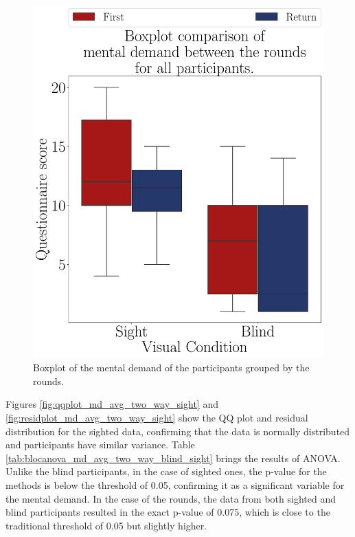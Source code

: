 \begin{figure}[!htb]
\begin{minipage}{0.45\textwidth}
        \includegraphics[width = \textwidth]{Resultados/Nasa/Figuras/pdf/boxplot_noBase_md_4_rounds.pdf}
        \caption{Boxplot of the mental demand of the participants grouped by the rounds.}
        \label{fig:boxplot_noBase_md_4_rounds}
    \end{minipage}
\end{figure}

Figures \ref{fig:qqplot_md_avg_two_way_sight} and \ref{fig:residplot_md_avg_two_way_sight} show the QQ plot and residual distribution for the sighted data, confirming that the data is normally distributed and participants have similar variance. Table \ref{tab:blocanova_md_avg_two_way_blind_sight} brings the results of ANOVA. Unlike the blind participants, in the case of sighted ones, the p-value for the methods is below the threshold of 0.05, confirming it as a significant variable for the mental demand. In the case of the rounds, the data from both sighted and blind participants resulted in the exact p-value of 0.075, which is close to the traditional threshold of 0.05 but slightly higher. 

